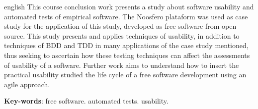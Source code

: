 \begin{resumo}[Abstract]
  \begin{otherlanguage*}{english}  
  	This course conclusion work presents a study about software usability and automated tests of empirical software. The Noosfero plataform was used as case study for the application of this study, developed as free software from open source. This study presents and applies techniques of usability, in addition to techniques of BDD and TDD in many applications of the case study mentioned, thus seeking to ascertain how these testing techniques can affect the assessments of usability of a software. Further work aims to understand how to insert the practical usability studied the life cycle of a free software development using an agile approach.
 
   \vspace{\onelineskip}
 
  \noindent 
  \textbf{Key-words}: free software. automated tests. usability.
  \end{otherlanguage*}
\end{resumo}
